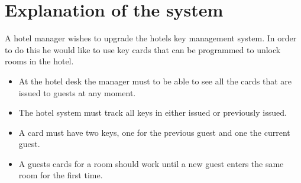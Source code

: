 \documentclass[Main]{subfiles}
\begin{document}
\section{Explanation of the system}

A hotel manager wishes to upgrade the hotels key management system.
In order to do this he would like to use key cards that can be programmed to unlock rooms in the hotel.

\begin{itemize}

  \item At the hotel desk the manager must to be able to see all the cards that are issued to guests at any moment.
  \item The hotel system must track all keys in either issued or previously issued.
  \item A card must have two keys, one for the previous guest and one the current guest.
  \item A guests cards for a room should work until a new guest enters the same room for the first time.

\end{itemize}
\end{document}
